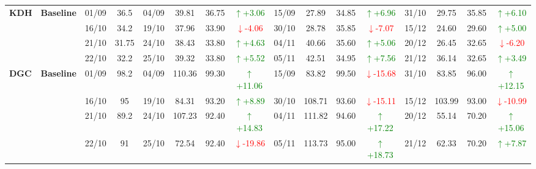 {\begin{longtable}{llcc|cccc|cccc|cccc}
\multirow{4}{*}{\textbf{KDH}}
& \textbf{Baseline}
& 01/09 & 36.5 & 04/09 & 39.81 & 36.75 & \textcolor{green}{\(\uparrow\)+3.06} & 15/09 & 27.89 & 34.85 & \textcolor{green}{\(\uparrow\)+6.96} & 31/10 & 29.75 & 35.85 & \textcolor{green}{\(\uparrow\)+6.10} \\
& & 16/10 & 34.2 & 19/10 & 37.96 & 33.90 & \textcolor{red}{\(\downarrow\)-4.06} & 30/10 & 28.78 & 35.85 & \textcolor{red}{\(\downarrow\)-7.07} & 15/12 & 24.60 & 29.60 & \textcolor{green}{\(\uparrow\)+5.00} \\
& & 21/10 & 31.75 & 24/10 & 38.43 & 33.80 & \textcolor{green}{\(\uparrow\)+4.63} & 04/11 & 40.66 & 35.60 & \textcolor{green}{\(\uparrow\)+5.06} & 20/12 & 26.45 & 32.65 & \textcolor{red}{\(\downarrow\)-6.20} \\
& & 22/10 & 32.2 & 25/10 & 39.32 & 33.80 & \textcolor{green}{\(\uparrow\)+5.52} & 05/11 & 42.51 & 34.95 & \textcolor{green}{\(\uparrow\)+7.56} & 21/12 & 36.14 & 32.65 & \textcolor{green}{\(\uparrow\)+3.49} \\
\midrule

\multirow{4}{*}{\textbf{DGC}}
& \textbf{Baseline}
& 01/09 & 98.2 & 04/09 & 110.36 & 99.30 & \textcolor{green}{\(\uparrow\)+11.06} & 15/09 & 83.82 & 99.50 & \textcolor{red}{\(\downarrow\)-15.68} & 31/10 & 83.85 & 96.00 & \textcolor{green}{\(\uparrow\)+12.15} \\
& & 16/10 & 95 & 19/10 & 84.31 & 93.20 & \textcolor{green}{\(\uparrow\)+8.89} & 30/10 & 108.71 & 93.60 & \textcolor{red}{\(\downarrow\)-15.11} & 15/12 & 103.99 & 93.00 & \textcolor{red}{\(\downarrow\)-10.99} \\
& & 21/10 & 89.2 & 24/10 & 107.23 & 92.40 & \textcolor{green}{\(\uparrow\)+14.83} & 04/11 & 111.82 & 94.60 & \textcolor{green}{\(\uparrow\)+17.22} & 20/12 & 55.14 & 70.20 & \textcolor{green}{\(\uparrow\)+15.06} \\
& & 22/10 & 91 & 25/10 & 72.54 & 92.40 & \textcolor{red}{\(\downarrow\)-19.86} & 05/11 & 113.73 & 95.00 & \textcolor{green}{\(\uparrow\)+18.73} & 21/12 & 62.33 & 70.20 & \textcolor{green}{\(\uparrow\)+7.87} \\
\midrule


\end{longtable}}
